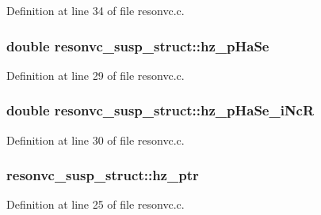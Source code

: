 Definition at line 34 of file resonvc.\+c.

\subsubsection[{\texorpdfstring{hz\+\_\+p\+Ha\+Se}{hz_pHaSe}}]{\setlength{\rightskip}{0pt plus 5cm}double resonvc\+\_\+susp\+\_\+struct\+::hz\+\_\+p\+Ha\+Se}\hypertarget{structresonvc__susp__struct_a000608a4b1f62d50f85ad9a29085ac41}{}\label{structresonvc__susp__struct_a000608a4b1f62d50f85ad9a29085ac41}


Definition at line 29 of file resonvc.\+c.

\subsubsection[{\texorpdfstring{hz\+\_\+p\+Ha\+Se\+\_\+i\+NcR}{hz_pHaSe_iNcR}}]{\setlength{\rightskip}{0pt plus 5cm}double resonvc\+\_\+susp\+\_\+struct\+::hz\+\_\+p\+Ha\+Se\+\_\+i\+NcR}\hypertarget{structresonvc__susp__struct_a36c134de4307a78bb6bb2b148675489e}{}\label{structresonvc__susp__struct_a36c134de4307a78bb6bb2b148675489e}


Definition at line 30 of file resonvc.\+c.

\subsubsection[{\texorpdfstring{hz\+\_\+ptr}{hz_ptr}}]{ resonvc\+\_\+susp\+\_\+struct\+::hz\+\_\+ptr}\hypertarget{structresonvc__susp__struct_ab927cc51ed7bebbd064d8240e34f00fd}{}\label{structresonvc__susp__struct_ab927cc51ed7bebbd064d8240e34f00fd}


Definition at line 25 of file resonvc.\+c.

